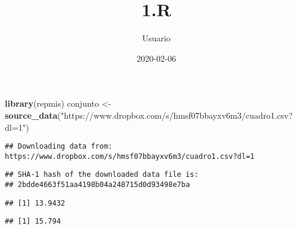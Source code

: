 \documentclass[
]{article}
\title{1.R}
\author{Usuario}
\date{2020-02-06}
\newenvironment{Shaded}{\begin{snugshade}}{\end{snugshade}}
\newcommand{\CommentTok}[1]{\textcolor[rgb]{0.56,0.35,0.01}{\textit{#1}}}
\newcommand{\KeywordTok}[1]{\textcolor[rgb]{0.13,0.29,0.53}{\textbf{#1}}}
\newcommand{\NormalTok}[1]{#1}
\newcommand{\OperatorTok}[1]{\textcolor[rgb]{0.81,0.36,0.00}{\textbf{#1}}}
\newcommand{\StringTok}[1]{\textcolor[rgb]{0.31,0.60,0.02}{#1}}
\begin{document}
\maketitle

\begin{Shaded}
\begin{Highlighting}[]
\KeywordTok{library}\NormalTok{(repmis)}
\NormalTok{conjunto <-}\StringTok{ }\KeywordTok{source_data}\NormalTok{(}\StringTok{"https://www.dropbox.com/s/hmsf07bbayxv6m3/cuadro1.csv?dl=1"}\NormalTok{)}
\end{Highlighting}
\end{Shaded}

\begin{verbatim}
## Downloading data from: https://www.dropbox.com/s/hmsf07bbayxv6m3/cuadro1.csv?dl=1
\end{verbatim}

\begin{verbatim}
## SHA-1 hash of the downloaded data file is:
## 2bdde4663f51aa4198b04a248715d0d93498e7ba
\end{verbatim}

\begin{Shaded}
\end{Shaded}

\begin{verbatim}
## [1] 13.9432
\end{verbatim}

\begin{Shaded}
\end{Shaded}

\begin{verbatim}
## [1] 15.794
\end{verbatim}

\begin{Shaded}
\end{Shaded}
\end{document}
